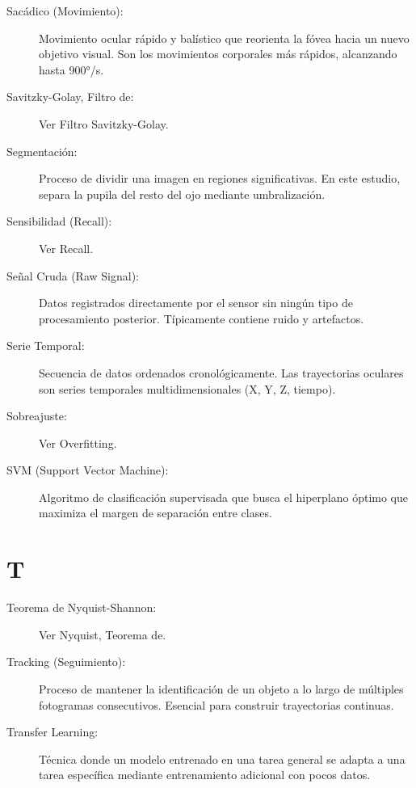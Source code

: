 \begin{description}
    \item[Sacádico (Movimiento):] Movimiento ocular rápido y balístico que reorienta la fóvea hacia un nuevo objetivo visual. Son los movimientos corporales más rápidos, alcanzando hasta 900°/s.
    
    \item[Savitzky-Golay, Filtro de:] Ver Filtro Savitzky-Golay.
    
    \item[Segmentación:] Proceso de dividir una imagen en regiones significativas. En este estudio, separa la pupila del resto del ojo mediante umbralización.
    
    \item[Sensibilidad (Recall):] Ver Recall.
    
    \item[Señal Cruda (Raw Signal):] Datos registrados directamente por el sensor sin ningún tipo de procesamiento posterior. Típicamente contiene ruido y artefactos.
    
    \item[Serie Temporal:] Secuencia de datos ordenados cronológicamente. Las trayectorias oculares son series temporales multidimensionales (X, Y, Z, tiempo).
    
    \item[Sobreajuste:] Ver Overfitting.
    
    \item[SVM (Support Vector Machine):] Algoritmo de clasificación supervisada que busca el hiperplano óptimo que maximiza el margen de separación entre clases.
\end{description}

\section*{T}

\begin{description}
    \item[Teorema de Nyquist-Shannon:] Ver Nyquist, Teorema de.
    
    \item[Tracking (Seguimiento):] Proceso de mantener la identificación de un objeto a lo largo de múltiples fotogramas consecutivos. Esencial para construir trayectorias continuas.
    
    \item[Transfer Learning:] Técnica donde un modelo entrenado en una tarea general se adapta a una tarea específica mediante entrenamiento adicional con pocos datos.
\end{description}

